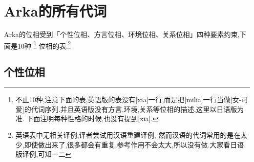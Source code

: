 \chapter[Arka的所有代词]{Arka的所有代词}
Arka的\hypertarget{appendix-pronouns}{位相}受到「个性位相、方言位相、环境位相、关系位相」四种要素约束,下面是10种
\footnote{
不止10种,注意下面的表,英语版的表没有[xia]一行,而是把[milia]一行当做[女-可爱]的代词序列.并且英语版没有方言,环境,关系等位相的描述,这里以日语版为准.
下面注明每种性格的时候,也没有提到[xia].
}
位相的表.\footnote{英语表中无相关译例,译者尝试用汉语重建译例,
	然而汉语的代词常用的是在太少,即使做出来了,很多都会有重复,参考作用不会太大,所以没有做.大家看日语版译例,可知一二
	}
\section{个性位相}

